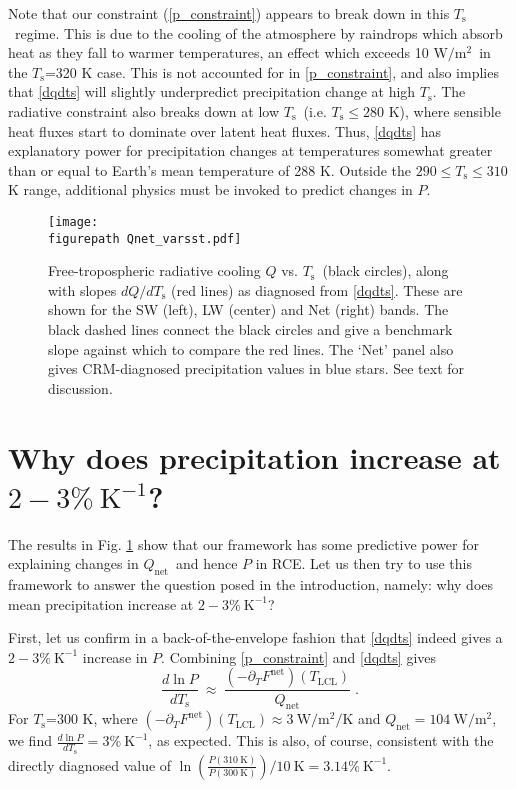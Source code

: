 \documentclass[9pt,twocolumn,twoside,lineno]{pnas-new}
\newcommand{\beqn}{\begin{equation}}
\newcommand{\eeqn}{\end{equation}}
\newcommand{\eqnref}[1]{(\ref{#1})}
\newcommand{\ppt}{\ensuremath{\partial_T}}
\newcommand{\Qnet}{\ensuremath{Q_\mathrm{net}}}
\newcommand{\Fnet}{\ensuremath{F^\mathrm{net}}}
\newcommand{\Wmsq}{\ensuremath{\mathrm{W/m^2}}}
\newcommand{\Kinverse}{\ensuremath{\mathrm{K^{-1}}}}
\newcommand{\Kelvin}{\ensuremath{\mathrm{K}}}
\newcommand{\Ts}{\ensuremath{T_\mathrm{s}}}
\newcommand{\Tlcl}{\ensuremath{T_\mathrm{LCL}}}
\newcommand{\figurepath}{./}
\begin{document}
Note that our constraint \eqnref{p_constraint} appears to break down in this  \Ts\ regime. This is due to the cooling of the atmosphere by raindrops which absorb heat as they fall to warmer temperatures, an effect which exceeds 10 \Wmsq\ in the \Ts=320 K case. This is not accounted for in \eqref{p_constraint}, and also implies that \eqref{dqdts} will slightly underpredict precipitation change at high \Ts. The radiative  constraint  also breaks down at low \Ts\ (i.e. $\Ts \leq 280$ K), where sensible heat fluxes start to dominate over latent heat fluxes. Thus, \eqref{dqdts} has explanatory power for  precipitation changes at  temperatures somewhat greater than or equal to Earth's mean temperature of 288 K. Outside the $290\leq \Ts \leq 310$ K range, additional physics must be invoked to predict changes in $P$.

\begin{figure}[t]
	\begin{center}
			\texttt{[image: \\figurepath Qnet\_varsst.pdf]}
		\caption{Free-tropospheric radiative cooling $Q$ vs. \Ts\ (black circles), along with slopes $d Q/d \Ts$ (red lines) as diagnosed from \eqref{dqdts}. These are shown for the SW (left), LW (center) and Net (right) bands.  The black dashed lines connect the black circles and give a benchmark slope against which to compare the red lines. The `Net' panel also gives CRM-diagnosed precipitation values in blue stars. See text for discussion.
		\label{Qnet_varsst}
		}
	\end{center}
\end{figure}



\section{Why does precipitation increase at $2 -3\%\ \Kinverse$?} \label{sec_1percent}
The results in Fig. \ref{Qnet_varsst} show that our framework  has some predictive power for explaining changes in \Qnet\ and hence $P$ in RCE. Let us then try to use this framework to answer the question posed in the introduction, namely: why does mean precipitation increase at $2 -3\%\ \Kinverse$?

First, let us confirm in a back-of-the-envelope fashion that \eqref{dqdts} indeed gives a $2 -3\%\ \Kinverse$ increase in $P$. Combining \eqref{p_constraint} and \eqref{dqdts} gives
	\beqn
		\frac{d \ln  P}{d \Ts} \ \approx\  \frac{(-\ppt \Fnet)(\Tlcl)}{\Qnet} \; .
	\label{precip_estimate}
	\eeqn
For \Ts=300 K, where $(-\ppt \Fnet)(\Tlcl) \approx 3 \ \Wmsq/\mathrm{K}$ and $\Qnet =  104\ \Wmsq$, we find $\frac{d \ln  P}{d \Ts}=  3\%\ \Kinverse$, as expected.  This is also, of course, consistent with the directly diagnosed value of $\ln\left(\frac{P(310\ \Kelvin)}{P(300\ \Kelvin)}\right)/10\ \Kelvin = 3.14 \%\  \Kinverse$.
\end{document}
